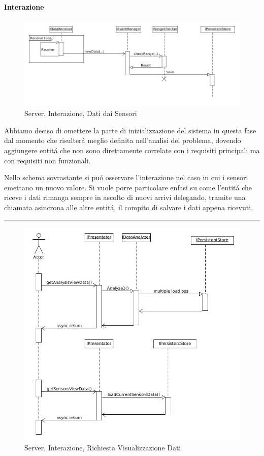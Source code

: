 \paragraph{Interazione}

\begin{figure}[h]
\centering
\includegraphics[width=\textwidth]{Figures/DomainModel/Server/NewDataInteraction}
\caption{Server, Interazione, Dati dai Sensori}
\end{figure}

Abbiamo deciso di omettere la parte di inizializzazione del sistema in questa fase dal momento che risulter\'a meglio definita nell'analisi del problema, dovendo aggiungere entit\'a che non sono direttamente correlate con i requisiti principali ma con requisiti non funzionali.

Nello schema sovrastante si pu\'o osservare l'interazione nel caso in cui i sensori emettano un nuovo valore. Si vuole porre particolare enfasi su come l'entit\'a che riceve i dati rimanga sempre in ascolto di nuovi arrivi delegando, tramite una chiamata asincrona alle altre entit\'a, il compito di salvare i dati appena ricevuti.

\noindent\rule[0.5ex]{\linewidth}{1pt}

\begin{figure}[h]
\centering
\includegraphics[width=\textwidth]{Figures/DomainModel/Server/GetOperationInteraction}
\caption{Server, Interazione, Richiesta Visualizzazione Dati}
\end{figure}

